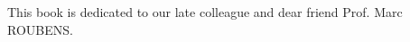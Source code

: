 
%
%
%

\begin{dedication}
  This book is dedicated to our late colleague and dear friend Prof. Marc ROUBENS.
\end{dedication}




